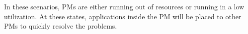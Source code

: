 





\vspace{5mm}


 In these scenarios, PMs are either running out of resources or running in a low utilization. At these states, applications inside the PM will be placed to other PMs to quickly resolve the problems.

